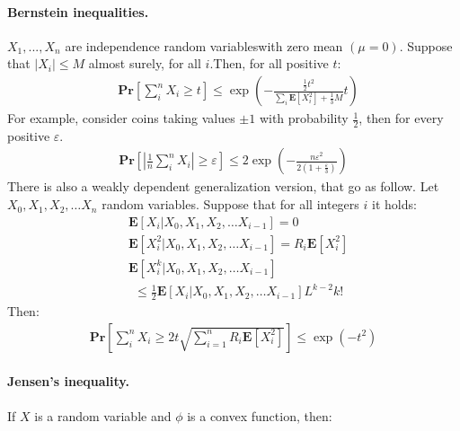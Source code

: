 \documentclass{article}
\newcommand{\prb}[1]{ \mathbf{Pr} \left[ {#1} \right]}
\newcommand{\expp}[1]{ \mathbf{E} \left[ {#1} \right]}
\newcommand{\indpr}{$ X_1, ..., X_n$ are independence random variables}
\begin{document}
\begin{multicols*}{2}
  \paragraph{Bernstein inequalities.} \indpr with zero mean $\left( \mu = 0  \right)$. Suppose that $|X_{i}| \le M $ almost surely, for all $i$.Then, for all positive $t$:
  \begin{equation*}
    \begin{split}
      & \prb{ \sum^{n}_{i}{X_i} \ge t  } \le \exp\left( -\frac{\frac{1}{2}t^{2}}{\sum_{i}{\expp{X_{i}^{2}}} + \frac{1}{3}M}t \right)
    \end{split}
  \end{equation*} For example, consider coins taking values $\pm 1$ with probability $\frac{1}{2}$, then for every positive $\varepsilon$. 
  \begin{equation*}
    \begin{split}
      \prb{ | \frac{1}{n}\sum_{i}^{n}{X_i} | \ge \varepsilon  } \le 2\exp\left( -\frac{n\varepsilon^{2}}{2\left( 1+\frac{\varepsilon}{3} \right)} \right) 
    \end{split}
  \end{equation*}
  There is also a weakly dependent generalization version, that go as follow. Let $X_{0},X_{1},X_{2},\ldots X_{n}$ random variables. Suppose that for all integers $i$ it holds:  
  \begin{equation*}
    \begin{split}
      &\expp{X_{i}|X_{0},X_{1},X_{2},\ldots X_{i-1}}=0\\
      & \expp{X_{i}^{2}|X_{0},X_{1},X_{2},\ldots X_{i-1}}= R_{i}\expp{X_{i}^{2}}\\
      & \expp{X_{i}^{k} | X_{0},X_{1},X_{2},\ldots X_{i-1}}  \\
      & \ \ \le \frac{1}{2}\expp{X_{i}|X_{0},X_{1},X_{2},\ldots X_{i-1}} L^{k-2}k! 
    \end{split}
  \end{equation*}
  Then: 
  \begin{equation*}
    \begin{split}
      \prb{\sum_{i}^{n}{X_{i}} \ge 2t \sqrt{ \sum_{i=1}^{n}{R_{i}\expp{X_{i}^{2}}} } } \le \exp\left(-t^{2} \right)
    \end{split}
  \end{equation*}
  \paragraph{Jensen's inequality.} If $X$ is a random variable and $\phi$ is a convex function, then:


\end{multicols*}
\end{document}
